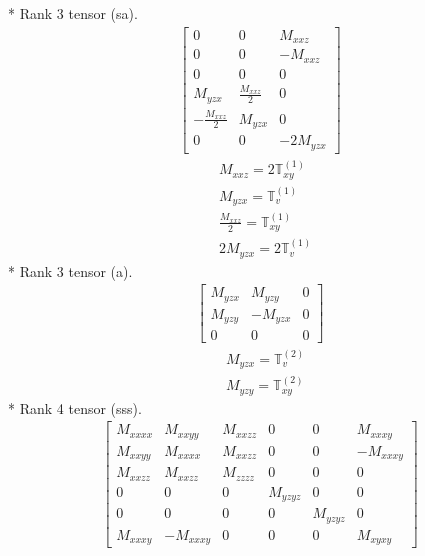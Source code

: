 \documentclass[fleqn,8pt,landscape]{jsarticle}
\begin{document}
* Rank 3 tensor (sa).
\begin{align*}
\begin{bmatrix} 0 & 0 & M_{xxz} \\ 0 & 0 & - M_{xxz} \\ 0 & 0 & 0 \\ M_{yzx} & \frac{M_{xxz}}{2} & 0 \\ - \frac{M_{xxz}}{2} & M_{yzx} & 0 \\ 0 & 0 & - 2 M_{yzx} \end{bmatrix}
\end{align*}
\begin{align*}
& M_{xxz} = 2 \mathbb{T}_{xy}^{(1)} \\
& M_{yzx} = \mathbb{T}_{v}^{(1)} \\
& \frac{M_{xxz}}{2} = \mathbb{T}_{xy}^{(1)} \\
& 2 M_{yzx} = 2 \mathbb{T}_{v}^{(1)}
\end{align*}
* Rank 3 tensor (a).
\begin{align*}
\begin{bmatrix} M_{yzx} & M_{yzy} & 0 \\ M_{yzy} & - M_{yzx} & 0 \\ 0 & 0 & 0 \end{bmatrix}
\end{align*}
\begin{align*}
& M_{yzx} = \mathbb{T}_{v}^{(2)} \\
& M_{yzy} = \mathbb{T}_{xy}^{(2)}
\end{align*}
* Rank 4 tensor (sss).
\begin{align*}
\begin{bmatrix} M_{xxxx} & M_{xxyy} & M_{xxzz} & 0 & 0 & M_{xxxy} \\ M_{xxyy} & M_{xxxx} & M_{xxzz} & 0 & 0 & - M_{xxxy} \\ M_{xxzz} & M_{xxzz} & M_{zzzz} & 0 & 0 & 0 \\ 0 & 0 & 0 & M_{yzyz} & 0 & 0 \\ 0 & 0 & 0 & 0 & M_{yzyz} & 0 \\ M_{xxxy} & - M_{xxxy} & 0 & 0 & 0 & M_{xyxy} \end{bmatrix}
\end{align*}
\end{document}
